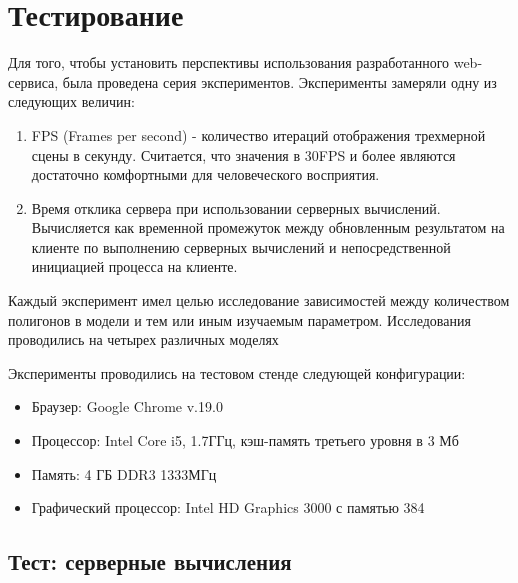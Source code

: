 \section{Тестирование}

Для того, чтобы установить перспективы использования разработанного web-сервиса,
была проведена серия экспериментов. Эксперименты замеряли одну из следующих
величин:
\begin{enumerate}
    \item FPS (Frames per second) - количество итераций отображения
    трехмерной сцены в секунду. Считается, что значения в 30FPS и более являются
    достаточно комфортными для человеческого восприятия.
    \item Время отклика сервера при использовании серверных
    вычислений. Вычисляется как временной промежуток между обновленным
    результатом на клиенте по выполнению серверных вычислений и непосредственной
    инициацией процесса на клиенте.
\end{enumerate}

Каждый эксперимент имел целью исследование зависимостей между количеством
полигонов в модели и тем или иным изучаемым параметром. Исследования проводились
на четырех различных моделях

\begin{center}
\end{center}

Эксперименты проводились на тестовом стенде следующей конфигурации:
\begin{itemize}
    \item Браузер: Google Chrome v.19.0
    \item Процессор: Intel Core i5, 1.7ГГц, кэш-память третьего уровня в 3 Мб
    \item Память: 4 ГБ DDR3 1333МГц
    \item Графический процессор: Intel HD Graphics 3000 с памятью 384
\end{itemize}

\subsection{Тест: серверные вычисления}

